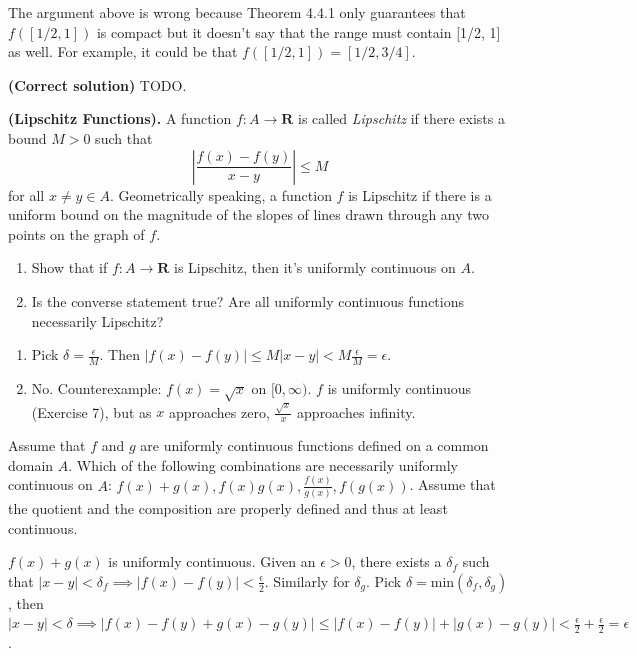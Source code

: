 \documentclass{oxmathproblems}
\begin{document}
\begin{questions}
\begin{solution}
\begin{enumerate}[label=(\alph*)]
    The argument above is wrong because Theorem 4.4.1 only guarantees that $f([1/2, 1])$ is compact but it doesn't say that the range must contain [1/2, 1] as well. For example, it could be that $f([1/2, 1]) = [1/2, 3/4]$.

    \textbf{(Correct solution)} TODO.
  \end{enumerate}
\end{solution}

\miquestion \textbf{(Lipschitz Functions).} A function $f : A \to \textbf{R}$ is called \textit{Lipschitz} if there exists a bound $M > 0$ such that
\[\left\lvert \frac{f(x) - f(y)}{x-y} \right\rvert \leq M\]
for all $x \neq y \in A$. Geometrically speaking, a function $f$ is Lipschitz if there is a uniform bound on the magnitude of the slopes of lines drawn through any two points on the
graph of $f$.
\begin{enumerate}[label=(\alph*)]
  \item Show that if $f: A \to \textbf{R}$ is Lipschitz, then it's uniformly continuous on $A$.
  \item Is the converse statement true? Are all uniformly continuous functions necessarily Lipschitz?
\end{enumerate}

\begin{solution}
  \begin{enumerate}[label=(\alph*)]
    \item Pick $\delta = \frac{\epsilon}{M}$. Then $|f(x)-f(y)| \leq M|x-y| < M\frac{\epsilon}{M} = \epsilon$.
    \item No. Counterexample: $f(x)=\sqrt{x}$ on $[0, \infty)$. $f$ is uniformly continuous (Exercise 7), but as $x$ approaches zero, $\frac{\sqrt{x}}{x}$ approaches infinity.
  \end{enumerate}
\end{solution}

\miquestion Assume that $f$ and $g$ are uniformly continuous functions defined on a common domain $A$. Which of the following combinations are necessarily uniformly continuous on $A$:
$f(x)+g(x), f(x)g(x), \frac{f(x)}{g(x)}, f(g(x))$. Assume that the quotient and the composition are properly defined and thus at least continuous.

\begin{solution}
  $f(x) + g(x)$ is uniformly continuous. Given an $\epsilon > 0$, there exists a $\delta_{f}$ such that $|x-y| < \delta_{f} \implies |f(x)-f(y)| < \frac{\epsilon}{2}$. Similarly for $\delta_{g}$.
  Pick $\delta = \text{min}(\delta_{f}, \delta_{g})$, then $|x-y| < \delta \implies |f(x)-f(y) + g(x)-g(y)| \leq |f(x)-f(y)| + |g(x)-g(y)| < \frac{\epsilon}{2} + \frac{\epsilon}{2} = \epsilon$.


\end{solution}
\end{questions}
\end{document}
